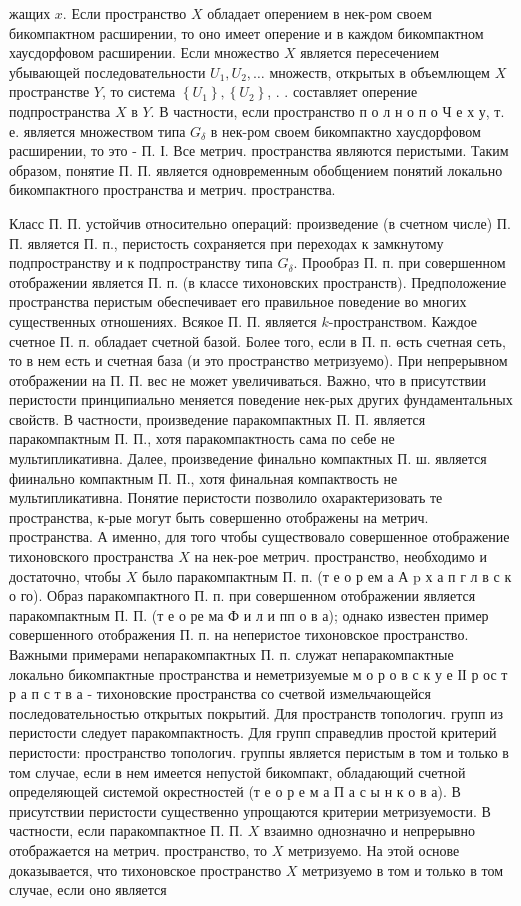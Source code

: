 \documentclass[10pt]{article}
\begin{document}
жащих $x$. Если пространство $X$ обладает оперением в нек-ром своем бикомпактном расширении, то оно имеет оперение и в каждом бикомпактном хаусдорфовом расширении. Если множество $X$ является пересечением убывающей последовательности $U_{1}, U_{2}, \ldots$ множеств, открытых в объемлющем $X$ пространстве $Y$, то система $\left\{U_{1}\right\},\left\{U_{2}\right\}$, . . составляет оперение подпространства $X$ в $Y$. В частности, если пространство п о л н о п о Ч е х у, т. е. является множеством типа $G_{\delta}$ в нек-ром своем бикомпактно хаусдорфовом расширении, то это - П. І. Все метрич. пространства являются перистыми. Таким образом, понятие П. П. является одновременным обобщением понятий локально бикомпактного пространства и метрич. пространства.

Класс П. П. устойчив относительно операций: произведение (в счетном числе) П. П. является П. п., перистость сохраняется при переходах к замкнутому подпространству и к подпространству типа $G_{\delta}$. Прообраз П. п. при совершенном отображении является П. п. (в классе тихоновских пространств). Предположение пространства перистым обеспечивает его правильное поведение во многих существенных отношениях. Всякое П. П. является $k$-пространством. Каждое счетное П. п. обладает счетной базой. Более того, если в П. п. өсть счетная сеть, то в нем есть и счетная база (и это пространство метризуемо). При непрерывном отображении на П. П. вес не может увеличиваться. Важно, что в присутствии перистости принципиально меняется поведение нек-рых других фундаментальных свойств. В частности, произведение паракомпактных П. П. является паракомпактным П. П., хотя паракомпактность сама по себе не мультипликативна. Далее, произведение финально компактных П. ш. является фиинально компактным П. П., хотя финальная компактвость не мультипликативна. Понятие перистости позволило охарактеризовать те пространства, к-рые могут быть совершенно отображены на метрич. пространства. А именно, для того чтобы существовало совершенное отображение тихоновского пространства $X$ на нек-рое метрич. пространство, необходимо и достаточно, чтобы $X$ было паракомпактным П. п. (т е о р ем а А p х а п г л в с к о го). Образ паракомпактного П. п. при совершенном отображении является паракомпактным П. П. (т е о ре ма Ф и л и пп о в а); однако известен пример совершенного отображения П. п. на неперистое тихоновское пространство. Важными примерами непаракомпактных П. п. служат непаракомпактные локально бикомпактные пространства и неметризуемые м о р о в с к у е ІІ р ос т р а п с т в а - тихоновские пространства со счетвой измельчающейся последовательностью открытых покрытий. Для пространств топологич. групп из перистости следует паракомпактность. Для групп справедлив простой критерий перистости: пространство топологич. группы является перистым в том и только в том случае, если в нем имеется непустой бикомпакт, обладающий счетной определяющей системой окрестностей (т е о р е м а П а с ы н к о в а). В присутствии перистости существенно упрощаются критерии метризуемости. В частности, если паракомпактное П. П. $X$ взаимно однозначно и непрерывно отображается на метрич. пространство, то $X$ метризуемо. На этой основе доказывается, что тихоновское пространство $X$ метризуемо в том и только в том случае, если оно является 
\end{document}
